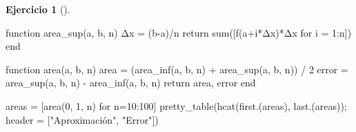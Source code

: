 \documentclass[
  a4paper,
]{scrreport}
\newenvironment{Shaded}{\begin{snugshade}}{\end{snugshade}}
\newcommand{\ControlFlowTok}[1]{\textcolor[rgb]{0.00,0.23,0.31}{#1}}
\newcommand{\FloatTok}[1]{\textcolor[rgb]{0.68,0.00,0.00}{#1}}
\newcommand{\FunctionTok}[1]{\textcolor[rgb]{0.28,0.35,0.67}{#1}}
\newcommand{\KeywordTok}[1]{\textcolor[rgb]{0.00,0.23,0.31}{#1}}
\newcommand{\NormalTok}[1]{\textcolor[rgb]{0.00,0.23,0.31}{#1}}
\newcommand{\OperatorTok}[1]{\textcolor[rgb]{0.37,0.37,0.37}{#1}}
\newcommand{\StringTok}[1]{\textcolor[rgb]{0.13,0.47,0.30}{#1}}
\theoremstyle{definition}
\newtheorem{exercise}{Ejercicio}[chapter]
\theoremstyle{remark}
\begin{document}
\begin{exercise}[]
\begin{enumerate}
\begin{tcolorbox}
\begin{Shaded}
\begin{Highlighting}[]
\KeywordTok{function} \FunctionTok{area\_sup}\NormalTok{(a, b, n)}
\NormalTok{    Δx }\OperatorTok{=}\NormalTok{ (b}\OperatorTok{{-}}\NormalTok{a)}\OperatorTok{/}\NormalTok{n}
    \ControlFlowTok{return} \FunctionTok{sum}\NormalTok{([}\FunctionTok{f}\NormalTok{(a}\OperatorTok{+}\NormalTok{i}\OperatorTok{*}\NormalTok{Δx)}\OperatorTok{*}\NormalTok{Δx for i }\OperatorTok{=} \FloatTok{1}\OperatorTok{:}\NormalTok{n])}
\KeywordTok{end}

\KeywordTok{function} \FunctionTok{area}\NormalTok{(a, b, n)}
\NormalTok{    area }\OperatorTok{=}\NormalTok{ (}\FunctionTok{area\_inf}\NormalTok{(a, b, n) }\OperatorTok{+} \FunctionTok{area\_sup}\NormalTok{(a, b, n)) }\OperatorTok{/} \FloatTok{2}
\NormalTok{    error }\OperatorTok{=} \FunctionTok{area\_sup}\NormalTok{(a, b, n) }\OperatorTok{{-}} \FunctionTok{area\_inf}\NormalTok{(a, b, n)}
    \ControlFlowTok{return}\NormalTok{ area, error}
\KeywordTok{end}

\NormalTok{areas }\OperatorTok{=}\NormalTok{ [}\FunctionTok{area}\NormalTok{(}\FloatTok{0}\NormalTok{, }\FloatTok{1}\NormalTok{, n) for n}\OperatorTok{=}\FloatTok{10}\OperatorTok{:}\FloatTok{100}\NormalTok{]}
\FunctionTok{pretty\_table}\NormalTok{(}\FunctionTok{hcat}\NormalTok{(}\FunctionTok{first}\NormalTok{.(areas), }\FunctionTok{last}\NormalTok{.(areas)); header }\OperatorTok{=}\NormalTok{ [}\StringTok{"Aproximación"}\NormalTok{, }\StringTok{"Error"}\NormalTok{])}
\end{Highlighting}
\end{Shaded}


\end{tcolorbox}
\end{enumerate}
\end{exercise}
\end{document}
